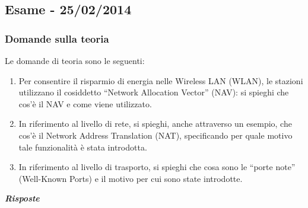 \documentclass[a4paper]{article}
\newcommand{\dquotes}[1]{``#1''}
\begin{document}
	\newpage

	\subsection[\textbf{Esame - 25/02/2014}]{Esame - 25/02/2014}
	
	\subsubsection{Domande sulla teoria}
	Le domande di teoria sono le seguenti:
	\begin{enumerate}
		\item Per consentire il risparmio di energia nelle Wireless LAN (WLAN), le stazioni utilizzano il cosiddetto \dquotes{Network Allocation Vector} (NAV): si spieghi che cos'è il NAV e come viene utilizzato.
		
		\item In riferimento al livello di rete, si spieghi, anche attraverso un esempio, che cos'è il Network Address Translation (NAT), specificando per quale motivo tale funzionalità è stata introdotta.
		
		\item In riferimento al livello di trasporto, si spieghi che cosa sono le \dquotes{porte note} (Well-Known Ports) e il motivo per cui sono state introdotte.
	\end{enumerate}
	\textcolor{Green4}{\textbf{\emph{Risposte}}}
\end{document}
